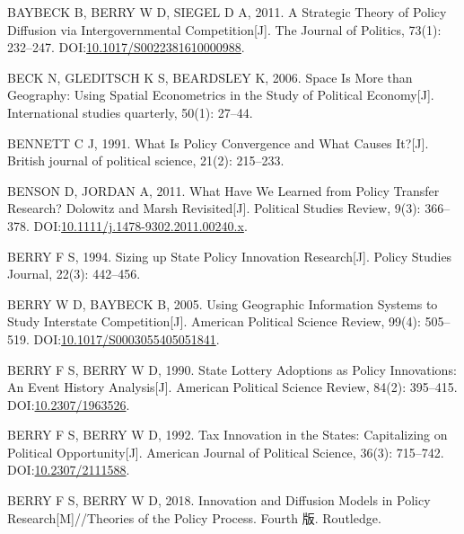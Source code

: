 \documentclass[
  12pt,
]{ctexart}
\newlength{\cslhangindent}
\newlength{\cslentryspacingunit} %
\newenvironment{CSLReferences}[2] %
 {%
  \setlength{\parindent}{0pt}
  \ifodd #1
  \let\oldpar\par
  \def\par{\hangindent=\cslhangindent\oldpar}
  \fi
  \setlength{\parskip}{#2\cslentryspacingunit}
 }%
 {}
\begin{document}
\begin{CSLReferences}{1}{0}
\leavevmode{}%
BAYBECK B, BERRY W D, SIEGEL D A, 2011. A {Strategic Theory} of {Policy Diffusion} via {Intergovernmental Competition}{[}J{]}. The Journal of Politics, 73(1): 232--247. DOI:\href{https://doi.org/10.1017/S0022381610000988}{10.1017/S0022381610000988}.

\leavevmode{}%
BECK N, GLEDITSCH K S, BEARDSLEY K, 2006. Space Is More than Geography: {Using} Spatial Econometrics in the Study of Political Economy{[}J{]}. International studies quarterly, 50(1): 27--44.

\leavevmode{}%
BENNETT C J, 1991. What Is Policy Convergence and What Causes It?{[}J{]}. British journal of political science, 21(2): 215--233.

\leavevmode{}%
BENSON D, JORDAN A, 2011. What Have We {Learned} from {Policy Transfer Research}? {Dolowitz} and {Marsh Revisited}{[}J{]}. Political Studies Review, 9(3): 366--378. DOI:\href{https://doi.org/10.1111/j.1478-9302.2011.00240.x}{10.1111/j.1478-9302.2011.00240.x}.

\leavevmode{}%
BERRY F S, 1994. Sizing up {State Policy Innovation Research}{[}J{]}. Policy Studies Journal, 22(3): 442--456.

\leavevmode{}%
BERRY W D, BAYBECK B, 2005. Using {Geographic Information Systems} to {Study Interstate Competition}{[}J{]}. American Political Science Review, 99(4): 505--519. DOI:\href{https://doi.org/10.1017/S0003055405051841}{10.1017/S0003055405051841}.

\leavevmode{}%
BERRY F S, BERRY W D, 1990. State {Lottery Adoptions} as {Policy Innovations}: {An Event History Analysis}{[}J{]}. American Political Science Review, 84(2): 395--415. DOI:\href{https://doi.org/10.2307/1963526}{10.2307/1963526}.

\leavevmode{}%
BERRY F S, BERRY W D, 1992. Tax {Innovation} in the {States}: {Capitalizing} on {Political Opportunity}{[}J{]}. American Journal of Political Science, 36(3): 715--742. DOI:\href{https://doi.org/10.2307/2111588}{10.2307/2111588}.

\leavevmode{}%
BERRY F S, BERRY W D, 2018. Innovation and {Diffusion Models} in {Policy Research}{[}M{]}//Theories of the {Policy Process}. Fourth 版. {Routledge}.


\end{CSLReferences}
\end{document}
